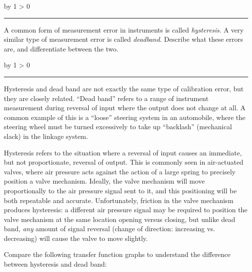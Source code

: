 \documentclass[12pt,a4paper]{article}
\def\oppgave{
            \advance\questnum by 1
            \ifnum \questnum > 0
                 \hrule
                 \vskip 3pt
                 \leftline{Oppgave \the\questnum}
                 \vskip 3pt \fi}
\def\svar{
           \advance\answnum by 1
           \ifnum \answnum > 0
                \hrule
                \vskip 3pt
                \leftline{Svar \the\answnum}
                \vskip 3pt \fi}
\begin{document}
\vfil \eject 



\oppgave{} 

A common form of measurement error in instruments is called {\it hysteresis}.  A very similar type of measurement error is called {\it deadband}.  Describe what these errors are, and differentiate between the two.

\vskip 10pt \filbreak 





\svar{} 

Hysteresis and dead band are not exactly the same type of calibration error, but they are closely related.  ``Dead band'' refers to a range of instrument measurement during reversal of input where the output does not change at all.  A common example of this is a ``loose'' steering system in an automobile, where the steering wheel must be turned excessively to take up ``backlash'' (mechanical slack) in the linkage system.  

Hysteresis refers to the situation where a reversal of input causes an immediate, but not proportionate, reversal of output.  This is commonly seen in air-actuated valves, where air pressure acts against the action of a large spring to precisely position a valve mechanism.  Ideally, the valve mechanism will move proportionally to the air pressure signal sent to it, and this positioning will be both repeatable and accurate.  Unfortunately, friction in the valve mechanism produces hysteresis: a different air pressure signal may be required to position the valve mechanism at the same location opening versus closing, but unlike dead band, {\it any} amount of signal reversal (change of direction: increasing vs. decreasing) will cause the valve to move slightly.

Compare the following transfer function graphs to understand the difference between hysteresis and dead band:
\end{document}
